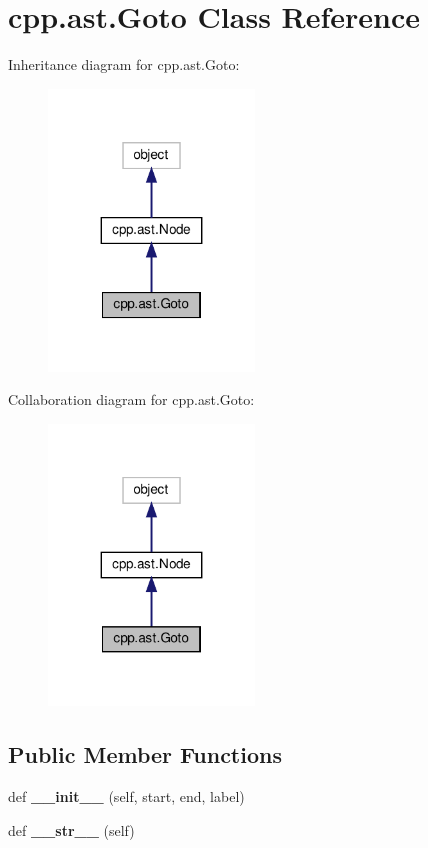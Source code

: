\hypertarget{classcpp_1_1ast_1_1_goto}{}\section{cpp.\+ast.\+Goto Class Reference}
\label{classcpp_1_1ast_1_1_goto}


Inheritance diagram for cpp.\+ast.\+Goto\+:
\nopagebreak
\begin{figure}[H]
\begin{center}
\leavevmode
\includegraphics[width=155pt]{classcpp_1_1ast_1_1_goto__inherit__graph}
\end{center}
\end{figure}


Collaboration diagram for cpp.\+ast.\+Goto\+:
\nopagebreak
\begin{figure}[H]
\begin{center}
\leavevmode
\includegraphics[width=155pt]{classcpp_1_1ast_1_1_goto__coll__graph}
\end{center}
\end{figure}
\subsection*{Public Member Functions}
\begin{DoxyCompactItemize}
\item 
\mbox{\label{classcpp_1_1ast_1_1_goto_a928e79374a90d01fc060985ea1e45260}} 
def {\bfseries \+\_\+\+\_\+init\+\_\+\+\_\+} (self, start, end, label)
\item 
\mbox{\label{classcpp_1_1ast_1_1_goto_a508b6bc091cf06bfed73a33368c236c9}} 
def {\bfseries \+\_\+\+\_\+str\+\_\+\+\_\+} (self)
\end{DoxyCompactItemize}

